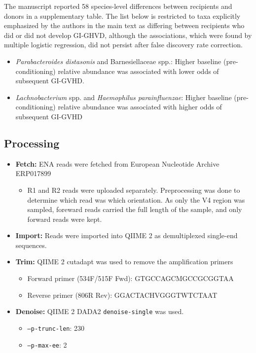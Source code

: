 \documentclass[11pt,a4paper]{article}
\begin{document}
The manuscript reported 58 species-level differences between recipients and donors in a supplementary table. The list below is restricted to taxa explicitly emphasized by the authors in the main text as differing between recipients who did or did not develop GI-GHVD, although the associations, which were found by multiple logistic regression, did not persist after false discovery rate correction. 
\begin{itemize}
\item \textit{Parabacteroides distasonis} and Barnesiellaceae spp.: Higher baseline (pre-conditioning) relative abundance was associated with lower odds of subsequent GI-GVHD.
\item \textit{Lachnobacterium} spp. and \textit{Haemophilus parainfluenzae}: Higher baseline (pre-conditioning) relative abundance was associated with higher odds of subsequent GI-GVHD 


\end{itemize}


\subsection{Processing}
\begin{itemize}
\item \textbf{Fetch:} ENA reads were fetched from European Nucleotide Archive ERP017899
\begin{itemize}
    \item R1 and R2 reads were uploaded separately. Preprocessing was done to determine which read was which orientation. As only the V4 region was sampled, foreward reads carried the full length of the sample, and only forward reads were kept. 
\end{itemize}
\item \textbf{Import:} Reads were imported into QIIME 2 as demultiplexed single-end sequences. 
\item \textbf{Trim:} QIIME 2 cutadapt was used to remove the amplification primers
  \begin{itemize}
  \item Forward primer (534F/515F Fwd): GTGCCAGCMGCCGCGGTAA
  \item Reverse primer (806R Rev): GGACTACHVGGGTWTCTAAT
  \end{itemize}
\item \textbf{Denoise:} QIIME 2 DADA2 \texttt{denoise-single} was used.  
  \begin{itemize}
  \item \texttt{--p-trunc-len}: 230
  \item \texttt{--p-max-ee}: 2
  \end{itemize}
\end{itemize}
\end{document}
